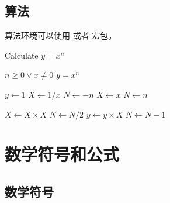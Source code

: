 \section{算法}

算法环境可以使用  或者  宏包。

\renewcommand{\algorithmicrequire}{\textbf{输入：}\unskip}
\renewcommand{\algorithmicensure}{\textbf{输出：}\unskip}

\begin{algorithm}
  \caption{Calculate $y = x^n$}
  \label{alg1}
  \small
  \begin{algorithmic}
    \REQUIRE $n \geq 0 \vee x \neq 0$
    \ENSURE $y = x^n$

    \STATE $y \leftarrow 1$
       \STATE $X \leftarrow 1 / x$
       \STATE $N \leftarrow -n$
    \ELSE
       \STATE $X \leftarrow x$
       \STATE $N \leftarrow n$
    \ENDIF

        \STATE $X \leftarrow X \times X$
        \STATE $N \leftarrow N / 2$
      \ELSE[$N$ is odd]
        \STATE $y \leftarrow y \times X$
        \STATE $N \leftarrow N - 1$
      \ENDIF
    \ENDWHILE
  \end{algorithmic}
\end{algorithm}


\chapter{数学符号和公式}

\section{数学符号}

